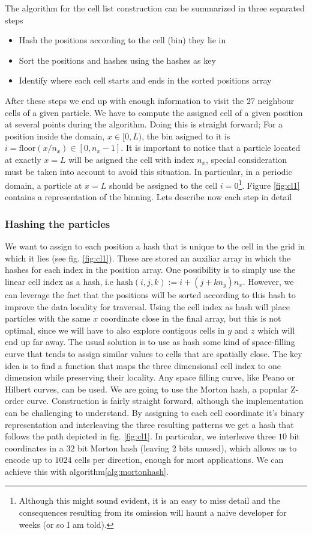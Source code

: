\documentclass[ twoside,openright,titlepage,numbers=noenddot,%
headinclude,footinclude,cleardoublepage=empty,abstract=on,
BCOR=5mm,paper=a4,fontsize=11pt, dvipsnames
]{scrreprt}
\begin{document}
The algorithm for the cell list construction can be summarized in three separated steps
\begin{itemize}
\item Hash the positions according to the cell (bin) they lie in
\item Sort the positions and hashes using the hashes as key
\item Identify where each cell starts and ends in the sorted positions array
\end{itemize}
After these steps we end up with enough information to visit the $27$ neighbour cells of a given particle.
We have to compute the assigned cell of a given position at several points during the algorithm. Doing this is straight forward; For a position inside the domain, $x \in [0, L)$, the bin asigned to it is $i = \textrm{floor}(x/n_x) \in [0, n_x- 1]$. It is important to notice that a particle located at exactly $x = L$ will be asigned the cell with index $n_x$, special consideration must be taken into account to avoid this situation. In particular, in a periodic domain, a particle at $x=L$ should be assigned to the cell $i=0$\footnote{Although this might sound evident, it is an easy to miss detail and the consequences resulting from its omission will haunt a naive developer for weeks (or so I am told).}.
Figure \ref{fig:cl1} contains a representation of the binning.
Lets describe now each step in detail
\subsubsection*{Hashing the particles}

We want to assign to each position a hash that is unique to the cell in the grid in which it lies (see fig. \ref{fig:cl1}).
These are stored an auxiliar array in which the hashes for each index in the position array.
One possibility is to simply use the linear cell index as a hash, i.e $\textrm{hash}(i,j,k) := i + (j + kn_y)n_x$.
However, we can leverage the fact that the positions will be sorted according to this hash to improve the data locality for traversal. Using the cell index as hash will place particles with the same $x$ coordinate close in the final array, but this is not optimal, since we will have to also explore contigous cells in $y$ and $z$ which will end up far away.
The usual solution is to use as hash some kind of space-filling curve that tends to assign similar values to cells that are spatially close. The key idea is to find a function that maps the three dimensional cell index to one dimension while preserving their locality. Any space filling curve, like Peano\cite{Peano1890} or Hilbert\cite{Hilbert1935} curves, can be used.
We are going to use the Morton hash\cite{Morton1966}, a popular Z-order curve. Construction is fairly straight forward, although the implementation can be challenging to understand.
By assigning to each cell coordinate it's binary representation and interleaving the three resulting patterns we get a hash that follows the path depicted in fig. \ref{fig:cl1}. In particular, we interleave three $10$ bit coordinates in a $32$ bit Morton hash (leaving 2 bits unused), which allows us to encode up to $1024$ cells per direction, enough for most applications. We can achieve this with algorithm\ref{alg:mortonhash}.
\end{document}
